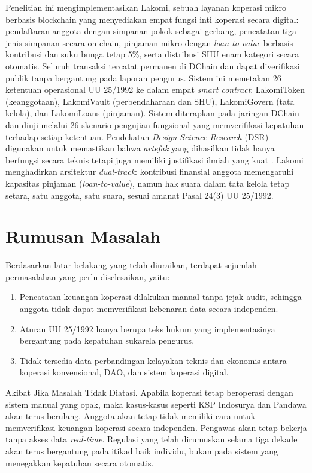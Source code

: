 \medskip
Penelitian ini mengimplementasikan Lakomi, sebuah layanan koperasi mikro berbasis blockchain yang menyediakan empat fungsi inti koperasi secara digital: pendaftaran anggota dengan simpanan pokok sebagai gerbang, pencatatan tiga jenis simpanan secara on-chain, pinjaman mikro dengan \textit{loan-to-value} berbasis kontribusi dan suku bunga tetap 5\%, serta distribusi SHU enam kategori secara otomatis. Seluruh transaksi tercatat permanen di DChain dan dapat diverifikasi publik tanpa bergantung pada laporan pengurus. Sistem ini memetakan 26 ketentuan operasional UU 25/1992 ke dalam empat \textit{smart contract}: LakomiToken (keanggotaan), LakomiVault (perbendaharaan dan SHU), LakomiGovern (tata kelola), dan LakomiLoans (pinjaman). Sistem diterapkan pada jaringan DChain dan diuji melalui 26 skenario pengujian fungsional yang memverifikasi kepatuhan terhadap setiap ketentuan. Pendekatan \textit{Design Science Research} (DSR) digunakan untuk memastikan bahwa \textit{artefak} yang dihasilkan tidak hanya berfungsi secara teknis tetapi juga memiliki justifikasi ilmiah yang kuat \cite{hevner2004design}. Lakomi menghadirkan arsitektur \textit{dual-track}: kontribusi finansial anggota memengaruhi kapasitas pinjaman (\textit{loan-to-value}), namun hak suara dalam tata kelola tetap setara, satu anggota, satu suara, sesuai amanat Pasal 24(3) UU 25/1992.

\section{Rumusan Masalah}

Berdasarkan latar belakang yang telah diuraikan, terdapat sejumlah permasalahan yang perlu diselesaikan, yaitu:

\begin{enumerate}
	\item Pencatatan keuangan koperasi dilakukan manual tanpa jejak audit, sehingga anggota tidak dapat memverifikasi kebenaran data secara independen.
	\item Aturan UU 25/1992 hanya berupa teks hukum yang implementasinya bergantung pada kepatuhan sukarela pengurus.
	\item Tidak tersedia data perbandingan kelayakan teknis dan ekonomis antara koperasi konvensional, DAO, dan sistem koperasi digital.
\end{enumerate}

\noindent Akibat Jika Masalah Tidak Diatasi. Apabila koperasi tetap beroperasi dengan sistem manual yang opak, maka kasus-kasus seperti KSP Indosurya dan Pandawa akan terus berulang. Anggota akan tetap tidak memiliki cara untuk memverifikasi keuangan koperasi secara independen. Pengawas akan tetap bekerja tanpa akses data \textit{real-time}. Regulasi yang telah dirumuskan selama tiga dekade akan terus bergantung pada itikad baik individu, bukan pada sistem yang menegakkan kepatuhan secara otomatis.

